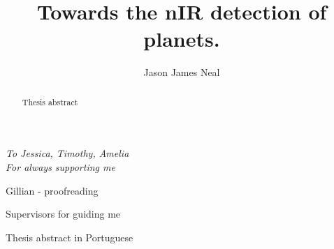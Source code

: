 \documentclass[fleqn]{fcup-thesis}
\author{Jason James Neal}
\title{Towards the nIR detection of planets.}
\begin{document}
	
	\begin{preliminary}
		
		\maketitle
		\cleardoublepage
		
		
		\begin{dedication}
			\centering \huge \itshape
			To Jessica, Timothy, Amelia\\For always supporting me
		\end{dedication}
		
		
		\begin{acknowledgements}
			
			Gillian - proofreading
			
			Supervisors for guiding me
			
			\vspace{7mm}
			
			
		\end{acknowledgements}
		
		
		
		\begin{abstract}
			
			Thesis abstract
		\end{abstract}
		
		\begin{abstract-pt}
			
			Thesis abstract in Portuguese
		\end{abstract-pt}
		
		
		
		\tableofcontents
		\listoftables
		\listoffigures
		
		\begin{abbreviations}		
			\begin{longtable}{ll}
				

\end{longtable}
\end{abbreviations}
\end{preliminary}
\end{document}
